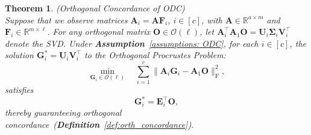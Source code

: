 \documentclass[final,3p,times]{elsarticle}
\theoremstyle{plain}
\newtheorem{theorem}{Theorem}[section]
\newcommand{\matr}[1]{\bm{#1}}        %
\begin{document}
\begin{theorem}
    \label{theorem: orthogonal concordance}
    (Orthogonal Concordance of ODC)\\
    Suppose that we observe matrices \(\matr{A}_i = \matr{A}\matr{F}_i\), \( i \in [c] \), with \(\matr{A}\in \mathbb{R}^{a\times m}\) and \(\matr{F}_i\in\mathbb{R}^{m\times \ell}\). For any orthogonal matrix \(\matr{O} \in \mathcal{O}(\ell)\), let \(\matr{A}_i^\top \matr{A}_1 \matr{O} = \matr{U}_i \matr{\Sigma}_i \matr{V}_i^\top \) denote the SVD. Under \textbf{Assumption}~\ref{assumptions: ODC}, for each \( i \in [c] \), the solution \( \matr{G}_i^* = \matr{U}_i \matr{V}_i^\top\) to the Orthogonal Procrustes Problem:
    \begin{equation}
    \min_{\matr{G}_i \in \mathcal{O}(\ell)} \quad \sum_{i=1}^{c} \| \matr{A}_i \matr{G}_i - \matr{A}_1 \matr{O} \|_\mathrm{F}^2,
    \end{equation}
    satisfies
    \begin{equation}
    \matr{G}_i^* = \matr{E}_i^\top \matr{O},
    \end{equation}
    thereby guaranteeing orthogonal concordance~(\textbf{Definition}~\ref{def:orth_concordance}).
\end{theorem}
\end{document}
